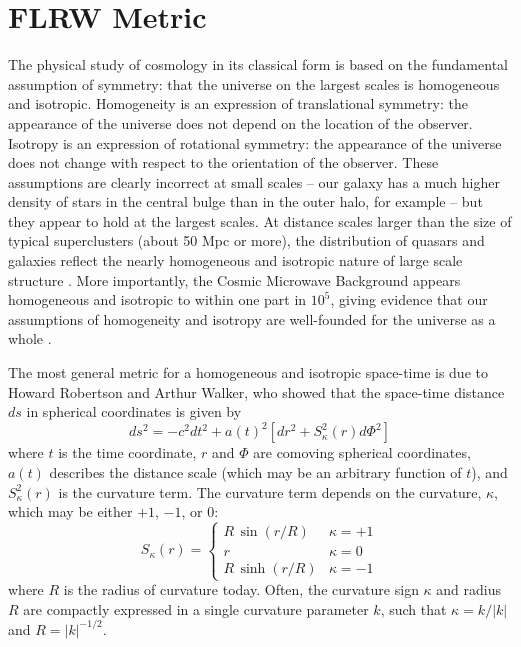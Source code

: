 \section{FLRW Metric}
\label{sec:FLRW}
The physical study of cosmology in its classical form
is based on the fundamental assumption of symmetry:
that the universe on the largest scales is homogeneous and isotropic.
Homogeneity is an expression of translational symmetry: the appearance of
the universe does not depend on the location of the observer.  Isotropy
is an expression of rotational symmetry: the appearance of the universe
does not change with respect to the orientation of the observer.
These assumptions are clearly incorrect at small scales -- our galaxy
has a much higher density of stars in the central bulge than in the
outer halo, for example -- but they appear to hold at
the largest scales.
At distance scales larger than the size of typical superclusters
(about 50 Mpc or more), the distribution of
quasars and galaxies reflect the nearly homogeneous and isotropic
nature of large scale structure \citep{Yadav2005, Sarkar2009}.
More importantly, the Cosmic Microwave
Background appears homogeneous and isotropic to within one part in
$10^5$, giving evidence that our assumptions of homogeneity and isotropy
are well-founded for the universe as a whole \citep[For an interesting
discussion of the limits of this approach, however, see][]{Maartens2011}.

The most general metric for a homogeneous and isotropic space-time is due
to Howard Robertson and Arthur Walker, who showed that the space-time
distance $ds$ in spherical coordinates is given by
\begin{equation}
  \label{eq:FLRW_metric}
  ds^2 = -c^2 dt^2 + a(t)^2\left[dr^2 + S_\kappa^2(r)d\Phi^2\right]
\end{equation}
where $t$ is the time coordinate, $r$ and $\Phi$ are comoving spherical
coordinates,
$a(t)$ describes the distance scale (which may be an arbitrary function
of $t$), and $S_\kappa^2(r)$ is the curvature term.  The curvature term
depends on the curvature, $\kappa$, which may be either $+1$, $-1$, or $0$:
\begin{equation}
  \label{eq:FLRW_curvature}
  S_\kappa(r) = \left\{
  \begin{array}{ll}
    R\,\sin(r/R) & \kappa = +1\\
    r & \kappa = 0\\
    R\,\sinh(r/R) & \kappa = -1
  \end{array}
  \right.
\end{equation}
where $R$ is the radius of curvature today.  Often, the curvature
sign $\kappa$ and radius $R$ are compactly expressed in a single curvature
parameter $k$, such that $\kappa = k/|k|$ and $R = |k|^{-1/2}$.

